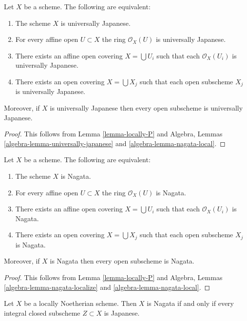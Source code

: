 \begin{lemma}
\label{lemma-locally-universally-Japanese}
Let $X$ be a scheme. The following are equivalent:
\begin{enumerate}
\item The scheme $X$ is universally Japanese.
\item For every affine open $U \subset X$ the ring $\mathcal{O}_X(U)$
is universally Japanese.
\item There exists an affine open covering $X = \bigcup U_i$
such that each $\mathcal{O}_X(U_i)$ is universally Japanese.
\item There exists an open covering $X = \bigcup X_j$
such that each open subscheme $X_j$ is universally Japanese.
\end{enumerate}
Moreover, if $X$ is universally Japanese then every open subscheme
is universally Japanese.
\end{lemma}

\begin{proof}
This follows from Lemma \ref{lemma-locally-P} and
Algebra, Lemmas \ref{algebra-lemma-universally-japanese} and
\ref{algebra-lemma-nagata-local}.
\end{proof}

\begin{lemma}
\label{lemma-locally-nagata}
Let $X$ be a scheme. The following are equivalent:
\begin{enumerate}
\item The scheme $X$ is Nagata.
\item For every affine open $U \subset X$ the ring $\mathcal{O}_X(U)$
is Nagata.
\item There exists an affine open covering $X = \bigcup U_i$
such that each $\mathcal{O}_X(U_i)$ is Nagata.
\item There exists an open covering $X = \bigcup X_j$
such that each open subscheme $X_j$ is Nagata.
\end{enumerate}
Moreover, if $X$ is Nagata then every open subscheme is Nagata.
\end{lemma}

\begin{proof}
This follows from Lemma \ref{lemma-locally-P} and
Algebra, Lemmas \ref{algebra-lemma-nagata-localize} and
\ref{algebra-lemma-nagata-local}.
\end{proof}

\begin{lemma}
\label{lemma-characterize-nagata}
Let $X$ be a locally Noetherian scheme.
Then $X$ is Nagata if and only if every integral closed subscheme
$Z \subset X$ is Japanese.
\end{lemma}

